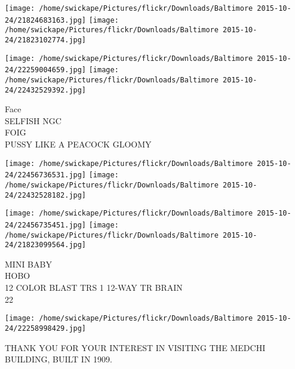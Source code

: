 \documentclass[10pt,letterpaper]{article}
\begin{document}
\texttt{[image: /home/swickape/Pictures/flickr/Downloads/Baltimore 2015-10-24/21824683163.jpg]}
\texttt{[image: /home/swickape/Pictures/flickr/Downloads/Baltimore 2015-10-24/21823102774.jpg]}

\texttt{[image: /home/swickape/Pictures/flickr/Downloads/Baltimore 2015-10-24/22259004659.jpg]}
\texttt{[image: /home/swickape/Pictures/flickr/Downloads/Baltimore 2015-10-24/22432529392.jpg]}

Face\\
SELFISH NGC\\
FOIG\\
PUSSY LIKE A PEACOCK GLOOMY
\pagebreak

\texttt{[image: /home/swickape/Pictures/flickr/Downloads/Baltimore 2015-10-24/22456736531.jpg]}
\texttt{[image: /home/swickape/Pictures/flickr/Downloads/Baltimore 2015-10-24/22432528182.jpg]}

\texttt{[image: /home/swickape/Pictures/flickr/Downloads/Baltimore 2015-10-24/22456735451.jpg]}
\texttt{[image: /home/swickape/Pictures/flickr/Downloads/Baltimore 2015-10-24/21823099564.jpg]}

MINI BABY\\
HOBO\\
12 COLOR BLAST TRS 1 12{-}WAY TR BRAIN\\
22
\pagebreak

\texttt{[image: /home/swickape/Pictures/flickr/Downloads/Baltimore 2015-10-24/22258998429.jpg]}

THANK YOU FOR YOUR INTEREST IN VISITING THE MEDCHI BUILDING, BUILT IN 1909.
\pagebreak
\end{document}
